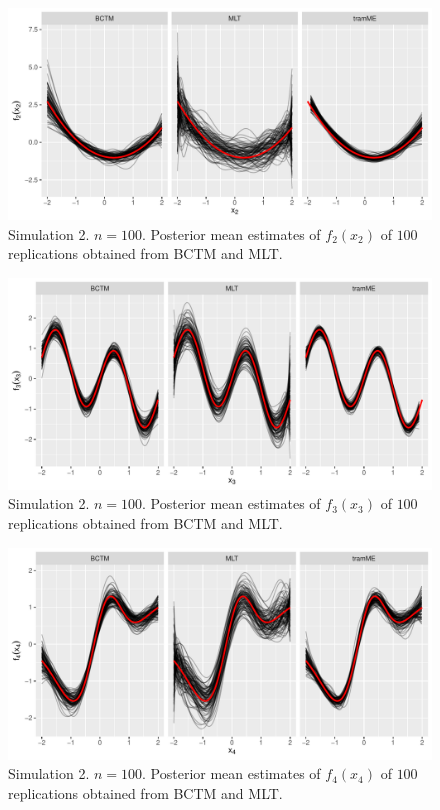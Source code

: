 \documentclass[12pt, a4paper]{article}
\begin{document}
\begin{figure}[!ht]
\begin{center}
\includegraphics[width=\textwidth]{figs/coverage_f2_n100_wtramme.pdf}
\caption{\footnotesize Simulation 2. $n=100$. Posterior mean estimates of $f_2(x_2)$ of $100$ replications obtained from BCTM and MLT.}\label{fig:eff2_n100}
\end{center}
\end{figure}

\begin{figure}[!ht]
\centering
\includegraphics[width=\textwidth]{figs/coverage_f3_n100_wtramme.pdf}
\caption{\footnotesize Simulation 2. $n=100$. Posterior mean estimates of $f_3(x_3)$ of $100$ replications obtained from BCTM and MLT.}\label{fig:eff3_n100}
\end{figure}


\begin{figure}[!ht]
\centering
\includegraphics[width=\textwidth]{figs/coverage_f4_n100_wtramme.pdf}
\caption{\footnotesize Simulation 2. $n=100$. Posterior mean estimates of $f_4(x_4)$ of $100$ replications obtained from BCTM and MLT.}\label{fig:eff4_n100}
\end{figure}
%
\end{document}
